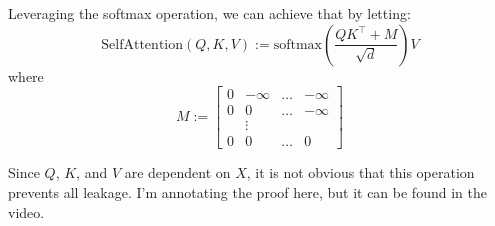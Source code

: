 \documentclass{article}
\begin{document}
\begin{itemize}
    \items Leveraging the softmax operation, we can achieve that by letting:
        $$\mathrm{SelfAttention}(Q, K, V) := \mathrm{softmax}\left(\frac{QK^\intercal + M}{\sqrt{d}}\right)V$$
        where
        $$M := \begin{bmatrix}
            0 & -\infty & \dots & -\infty \\
            0 &       0 & \dots & -\infty \\
            &\vdots&&\\
            0 &       0 & \dots & 0
        \end{bmatrix}$$

    \items Since $Q$, $K$, and $V$ are dependent on $X$, it is not obvious that this operation prevents all leakage. I'm annotating the proof here, but it can be found in the video.
\end{itemize}
\end{document}
